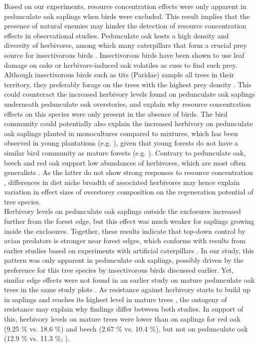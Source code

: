 \documentclass[10pt, twoside]{book} %
\begin{document}
	Based on our experiments, resource concentration effects were only apparent in pedunculate oak saplings when birds were excluded. This result implies that the presence of natural enemies may hinder the detection of resource concentration effects in observational studies. Pedunculate oak hosts a high density and diversity of herbivores, among which many caterpillars that form a crucial prey source for insectivorous birds \citep{Naef-Daenzer2000}. Insectivorous birds have been shown to use leaf damage on oaks \citep{Gunnarsson2018, Heinrich1983} or herbivore-induced oak volatiles \citep{Amo2013} as cues to find such prey. Although insectivorous birds such as tits (Paridae) sample all trees in their territory, they preferably forage on the trees with the highest prey density \citep{Naef-Daenzer2000}. This could counteract the increased herbivory levels found on pedunculate oak saplings underneath pedunculate oak overstories, and explain why resource concentration effects on this species were only present in the absence of birds. The bird community could potentially also explain the increased herbivory on pedunculate oak saplings planted in monocultures compared to mixtures, which has been observed in young plantations (e.g. \citealt{Alalouni2014, Setiawan2014}), given that young forests do not have a similar bird community as mature forests (e.g. \citealt{Whytock2018}). Contrary to pedunculate oak, beech and red oak support low abundances of herbivores, which are most often generalists \citep{Branco2015, Brandle2001, Goßner2004}. As the latter do not show strong responses to resource concentration \citep{Castagneyrol2014, Jactel2005}, differences in diet niche breadth of associated herbivores may hence explain variation in effect sizes of overstorey composition on the regeneration potential of tree species.\\
	
	Herbivory levels on pedunculate oak saplings outside the exclosures increased further from the forest edge, but this effect was much weaker for saplings growing inside the exclosures. Together, these results indicate that top-down control by avian predators is stronger near forest edges, which conforms with results from earlier studies based on experiments with artificial caterpillars \citep{Barbaro2014, Gonzalez-Gomez2006}. In our study, this pattern was only apparent in pedunculate oak saplings, possibly driven by the preference for this tree species by insectivorous birds discussed earlier. Yet, similar edge effects were not found in an earlier study on mature pedunculate oak trees in the same study plots \citep{VanSchrojensteinLantman2018}. As resistance against herbivory starts to build up in saplings and reaches its highest level in mature trees \citep{Boege2005}, the ontogeny of resistance may explain why findings differ between both studies. In support of this, herbivory levels on mature trees were lower than on saplings for red oak (9.25 \% vs. 18.6 \%) and beech (2.67 \% vs. 10.4 \%), but not on pedunculate oak (12.9 \% vs. 11.3 \%; \citealt{VanSchrojensteinLantman2018}).\\
	
\end{document}
